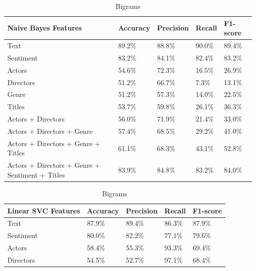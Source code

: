 \documentclass[
10pt, %
a4paper, %
oneside, %
headinclude,footinclude, %
] {book}%
\begin{document}
\begin{table}[hbtp]
\centering
\caption{Bigrams}
\label{Table 4}
\begin{tabular}{@{}lllll@{}}
\toprule
Naive Bayes Features                           & Accuracy & Precision & Recall & F1-score \\ \midrule
Text                              & 89.2\%       & 88.8\%          & 90.0\%       & 89.4\%         \\
Sentiment                         & 83.2\%         & 84.1\%          & 82.4\%       & 83.2\%         \\
Actors                            & 54.6\%         & 72.3\%          & 16.5\%       & 26.9\%         \\
Directors                         & 51.2\%         & 66.7\%          & 7.3\%       & 13.1\%         \\
Genre                             & 51.2\%         & 57.3\%          & 14.0\%       & 22.5\%         \\
Titles                            & 53.7\%         & 59.8\%          & 26.1\%       & 36.3\%         \\
Actors + Directors                        & 56.0\%         & 71.9\%          & 21.4\%       & 33.0\%         \\
Actors + Directors + Genre                        & 57.4\%         & 68.5\%          & 29.2\%       & 41.0\%         \\
Actors + Directors + Genre + Titles                       & 61.1\%         & 68.3\%          & 43.1\%       & 52.8\%         \\
Actors + Directors + Genre + Sentiment + Titles                    & 83.9\%         & 84.8\%          & 83.2\%       & 84.0\%         \\
\end{tabular}
\begin{tabular}{@{}lllll@{}}
\toprule
Linear SVC Features                           & Accuracy & Precision & Recall & F1-score \\ \midrule
Text                              & 87.9\%       & 89.4\%          & 86.3\%       & 87.9\%         \\
Sentiment                         & 80.0\%         & 82.2\%          & 77.1\%       & 79.6\%         \\
Actors                            & 58.4\%         & 55.3\%          & 93.3\%       & 69.4\%         \\
Directors                         & 54.5\%         & 52.7\%          & 97.1\%       & 68.4\%         \\

\end{tabular}
\end{table}
\end{document}
